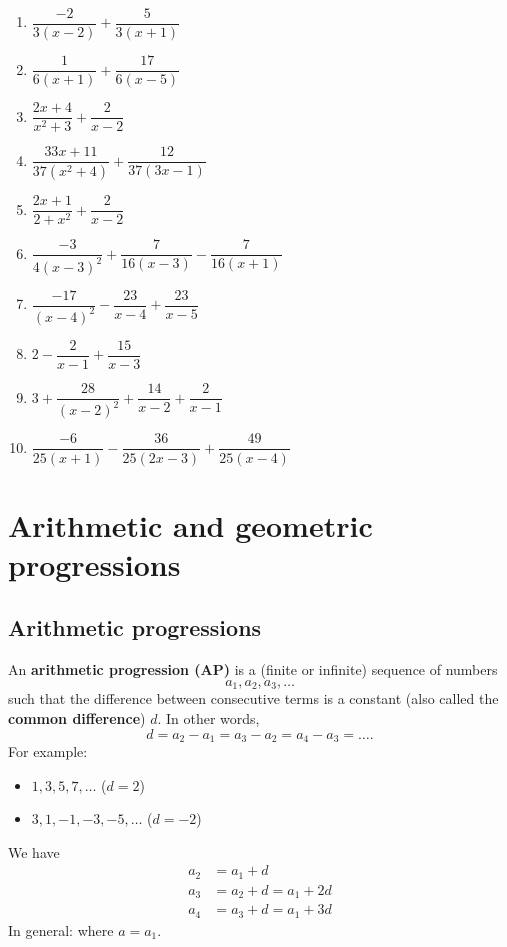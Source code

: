 \documentclass[
  12pt,
  oneside]{book}
\providecommand{\tightlist}{%
  \setlength{\itemsep}{0pt}\setlength{\parskip}{0pt}}
\theoremstyle{definition}
\theoremstyle{definition}
\theoremstyle{definition}
\theoremstyle{definition}
\theoremstyle{remark}
\begin{document}
\begin{enumerate}
\def\labelenumi{\roman{enumi})}
\tightlist
\item
  \(\dfrac{-2}{3(x-2)}+\dfrac 5{3(x+1)}\)
\item
  \(\dfrac 1{6(x+1)}+\dfrac{17}{6(x-5)}\)
\item
  \(\dfrac{2x+4}{x^2+3}+\dfrac 2{x-2}\)
\item
  \(\dfrac{33x+11}{37(x^2+4)}+\dfrac{12}{37(3x-1)}\)
\item
  \(\dfrac{2x+1}{2+x^2}+\dfrac 2{x-2}\)
\item
  \(\dfrac{-3}{4(x-3)^2}+\dfrac 7{16(x-3)}-\dfrac 7{16(x+1)}\)
\item
  \(\dfrac{-17}{(x-4)^2}-\dfrac{23}{x-4}+\dfrac{23}{x-5}\)
\item
  \(2-\dfrac 2{x-1}+\dfrac{15}{x-3}\)
\item
  \(3+\dfrac{28}{(x-2)^2}+\dfrac{14}{x-2}+\dfrac 2{x-1}\)
\item
  \(\dfrac{-6}{25(x+1)}-\dfrac{36}{25(2x-3)}+\dfrac{49}{25(x-4)}\)
\end{enumerate}

\chapter{Arithmetic and geometric progressions}\label{arithmetic-and-geometric-progressions}

\section{Arithmetic progressions}\label{arithmetic-progressions}

An \textbf{arithmetic progression (AP)} is a (finite or infinite) sequence of numbers
\[
a_1,a_2,a_3,\dots
\]
such that the difference between consecutive terms is a constant (also called the \textbf{common difference}) \(d\). In other words,
\[
d=a_2-a_1=a_3-a_2=a_4-a_3=\dots.
\]
For example:

\begin{itemize}
\tightlist
\item
  \(1,3,5,7,\dots\) \quad (\(d=2\))
\item
  \(3,1,-1,-3,-5,\dots\) \quad (\(d=-2\))
\end{itemize}

We have
\begin{align*}
    a_2&=a_1+d\\
    a_3&=a_2+d=a_1+2d \\
    a_4&=a_3+d=a_1+3d
\end{align*}
In general:  where \(a=a_1\).
\end{document}
